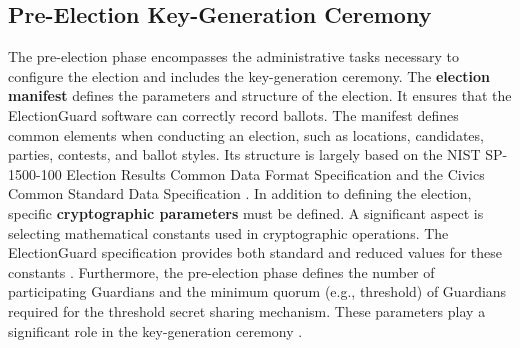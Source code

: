 \subsection{Pre-Election Key-Generation Ceremony}
The pre-election phase encompasses the administrative tasks necessary to configure the election and includes the key-generation ceremony. The \textbf{election manifest} defines the parameters and structure of the election. It ensures that the ElectionGuard software can correctly record ballots. The manifest defines common elements when conducting an election, such as locations, candidates, parties, contests, and ballot styles.  Its structure is largely based on the NIST SP-1500-100 Election Results Common Data Format Specification and the Civics Common Standard Data Specification \cite{eg-docs}. In addition to defining the election, specific \textbf{cryptographic parameters} must be defined. A significant aspect is selecting mathematical constants used in cryptographic operations. The ElectionGuard specification provides both standard and reduced values for these constants \cite[21, 36-38]{eg-spec}. Furthermore, the pre-election phase defines the number of participating Guardians and the minimum quorum (e.g., threshold) of Guardians required for the threshold secret sharing mechanism. These parameters play a significant role in the key-generation ceremony \cite[8-9]{eg-paper}.
